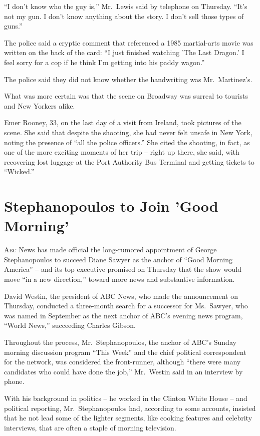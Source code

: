 ﻿\documentclass[12pt]{article}
\begin{document}
``I don't know who the guy is,'' Mr.~Lewis said by telephone on Thursday. ``It's not my gun. I don't
know anything about the story. I don't sell those types of guns.''

The police said a cryptic comment that referenced a 1985 martial-arts movie was written on the back
of the card: ``I just finished watching 'The Last Dragon.' I feel sorry for a cop if he think I'm
getting into his paddy wagon.''

The police said they did not know whether the handwriting was Mr.~Martinez's.

What was more certain was that the scene on Broadway was surreal to tourists and New Yorkers alike.

Emer Rooney, 33, on the last day of a visit from Ireland, took pictures of the scene. She said that
despite the shooting, she had never felt unsafe in New York, noting the presence of ``all the police
officers.'' She cited the shooting, in fact, as one of the more exciting moments of her trip --
right up there, she said, with recovering lost luggage at the Port Authority Bus Terminal and
getting tickets to ``Wicked.''

\section{Stephanopoulos to Join 'Good Morning'}

\lettrine{A}{bc} News has made official the long-rumored appointment of
George Stephanopoulos to succeed Diane Sawyer as the anchor of ``Good Morning America'' -- and its
top executive promised on Thursday that the show would move ``in a new direction,'' toward more news
and substantive information.

David Westin, the president of ABC News, who made the announcement on Thursday, conducted a
three-month search for a successor for Ms.~Sawyer, who was named in September as the next anchor of
ABC's evening news program, ``World News,'' succeeding Charles Gibson.

Throughout the process, Mr.~Stephanopoulos, the anchor of ABC's Sunday morning discussion program
``This Week'' and the chief political correspondent for the network, was considered the
front-runner, although ``there were many candidates who could have done the job,'' Mr.~Westin said
in an interview by phone.

With his background in politics -- he worked in the Clinton White House -- and political reporting,
Mr.~Stephanopoulos had, according to some accounts, insisted that he not lead some of the lighter
segments, like cooking features and celebrity interviews, that are often a staple of morning
television.
\end{document}
